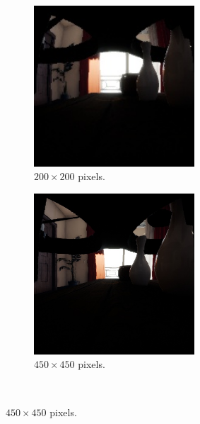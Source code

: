 \begin{figure}[!htb]
    \centering
    \begin{subfigure}{0.45\textwidth}
        \centering
        \includegraphics[height=6cm]{rapport/fig/Results/single/single_256_200.jpeg}
        \caption{$200 \times 200$ pixels.}
        \label{fig:res_comp_single_256_200}
    \end{subfigure}
    \begin{subfigure}{0.45\textwidth}
        \centering
        \includegraphics[height=6cm]{rapport/fig/Results/single/single_512_450.jpeg}
        \caption{$450 \times 450$ pixels.}
        \label{fig:res_comp_single_512_450}
    \end{subfigure} \\


\end{figure}
